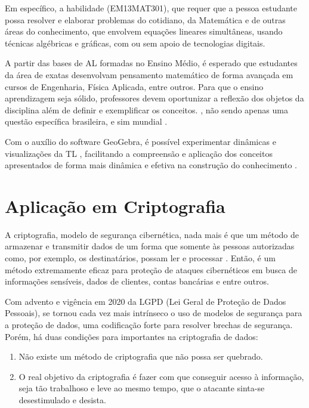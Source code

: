 Em específico, a habilidade (EM13MAT301), que requer que a pessoa estudante possa resolver e elaborar problemas do cotidiano, da Matemática e de outras áreas do conhecimento, que envolvem equações lineares simultâneas, usando técnicas algébricas e gráficas, com ou sem apoio de tecnologias digitais.

A partir das bases de AL formadas no Ensino Médio, é esperado que estudantes da área de exatas desenvolvam pensamento matemático de forma avançada em cursos de Engenharia, Física Aplicada, entre outros. Para que o ensino aprendizagem seja sólido, professores devem oportunizar a reflexão dos objetos da disciplina além de definir e exemplificar os conceitos. \cite{marins_savioli_2016}, não sendo apenas uma questão específica brasileira, e sim mundial \cite{pena2016}.

Com o auxílio do software GeoGebra, é possível experimentar dinâmicas e visualizações da TL \cite{eliza2015}, facilitando a compreensão e aplicação dos conceitos apresentados de forma mais dinâmica e efetiva na construção do conhecimento \cite{souzasilzaeliza2017}.

\section{Aplicação em Criptografia}
A criptografia, modelo de segurança cibernética, nada mais é que um método de armazenar e transmitir dados de um forma que somente às pessoas autorizadas como, por exemplo, os destinatários, possam ler e processar \cite{helio2009}. Então, é um método extremamente eficaz para proteção de ataques cibernéticos em busca de informações sensíveis, dados de clientes, contas bancárias e entre outros.

Com advento e vigência em 2020 da LGPD (Lei Geral de Proteção de Dados Pessoais), se tornou cada vez mais intrínseco o uso de modelos de segurança para a proteção de dados, uma codificação forte para resolver brechas de segurança. Porém, há duas condições para importantes na criptografia de dados:

\begin{enumerate}
	\item Não existe um método de criptografia que não possa ser quebrado.
	\item O real objetivo da criptografia é fazer com que conseguir acesso à informação, seja tão trabalhoso e leve ao mesmo tempo, que o atacante sinta-se desestimulado e desista.
\end{enumerate}

